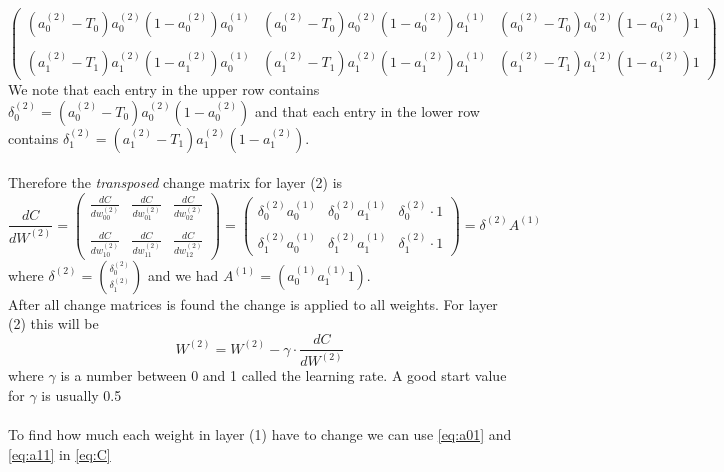 \documentclass{article}
\begin{document}
$$\begin{pmatrix}
(a_0^{(2)}-T_0)a_0^{(2)}(1-a_0^{(2)})a_0^{(1)} & (a_0^{(2)}-T_0)a_0^{(2)}(1-a_0^{(2)})a_1^{(1)} & (a_0^{(2)}-T_0)a_0^{(2)}(1-a_0^{(2)})1
\\\\
(a_1^{(2)}-T_1)a_1^{(2)}(1-a_1^{(2)})a_0^{(1)} & (a_1^{(2)}-T_1)a_1^{(2)}(1-a_1^{(2)})a_1^{(1)} & (a_1^{(2)}-T_1)a_1^{(2)}(1-a_1^{(2)})1
\end{pmatrix}$$
We note that each entry in the upper row contains $\delta_0^{(2)} = (a_0^{(2)}-T_0)a_0^{(2)}(1-a_0^{(2)})$ and that each entry in the lower row contains $\delta_1^{(2)} = (a_1^{(2)}-T_1)a_1^{(2)}(1-a_1^{(2)})$.
\\
\\
Therefore the \textit{transposed} change matrix for layer (2) is $$\frac{dC}{dW^{(2)}} =
\begin{pmatrix}
\frac{dC}{dw_{00}^{(2)}} & \frac{dC}{dw_{01}^{(2)}} & \frac{dC}{dw_{02}^{(2)}}
\\\\
\frac{dC}{dw_{10}^{(2)}} & \frac{dC}{dw_{11}^{(2)}} & \frac{dC}{dw_{12}^{(2)}}
\end{pmatrix} = \begin{pmatrix}
\delta_0^{(2)}a_0^{(1)} & \delta_0^{(2)}a_1^{(1)} & \delta_0^{(2)} \cdot 1
\\\\
\delta_1^{(2)}a_0^{(1)} & \delta_1^{(2)}a_1^{(1)} & \delta_1^{(2)} \cdot 1
\end{pmatrix} = \delta^{(2)}A^{(1)}
$$
where $\delta^{(2)} = \binom{\delta_0^{(2)}}{\delta_1^{(2)}}$
and we had $A^{(1)} = (a_0^{(1)} a_1^{(1)} 1)$.
\\
After all change matrices is found the change is applied to all weights. For layer (2) this will be $$W^{(2)} = W^{(2)} - \gamma \cdot \frac{dC}{dW^{(2)}}$$
where $\gamma$ is a number between 0 and 1 called the learning rate. A good start value for $\gamma$ is usually 0.5
\\
\\
To find how much each weight in layer (1) have to change we can use \textcolor{green}{\eqref{eq:a01}} and \textcolor{darkblue}{\eqref{eq:a11}} in \eqref{eq:C}
\end{document}

